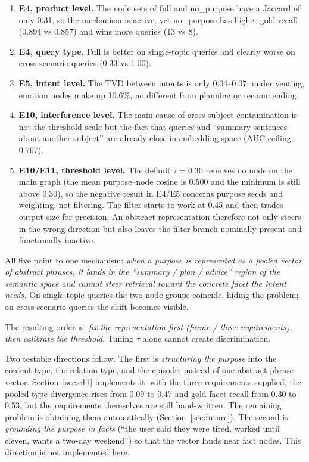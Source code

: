 \documentclass[11pt]{article}
\begin{document}
\begin{enumerate}
  \item \textbf{E4, product level.} The node sets of full and no\_purpose have a Jaccard of only
        0.31, so the mechanism is active; yet no\_purpose has higher gold recall (0.894 vs 0.857)
        and wins more queries (13 vs 8).
  \item \textbf{E4, query type.} Full is better on single-topic queries and clearly worse on
        cross-scenario queries (0.33 vs 1.00).
  \item \textbf{E5, intent level.} The TVD between intents is only 0.04--0.07; under venting,
        emotion nodes make up 10.6\%, no different from planning or recommending.
  \item \textbf{E10, interference level.} The main cause of cross-subject contamination is not
        the threshold scale but the fact that queries and ``summary sentences about another
        subject'' are already close in embedding space (AUC ceiling 0.767).
  \item \textbf{E10/E11, threshold level.} The default $\tau=0.30$ removes no node on the main
        graph (the mean purpose--node cosine is 0.500 and the minimum is still above 0.30), so the
        negative result in E4/E5 concerns purpose seeds and weighting, not filtering. The filter
        starts to work at 0.45 and then trades output size for precision. An abstract
        representation therefore not only steers in the wrong direction but also leaves the filter
        branch nominally present and functionally inactive.
\end{enumerate}

All five point to one mechanism: \emph{when a purpose is represented as a pooled vector of
abstract phrases, it lands in the ``summary / plan / advice'' region of the semantic space and
cannot steer retrieval toward the concrete facet the intent needs.} On single-topic queries the
two node groups coincide, hiding the problem; on cross-scenario queries the shift becomes
visible.

The resulting order is: \emph{fix the representation first (frame / three requirements), then
calibrate the threshold}. Tuning $\tau$ alone cannot create discrimination.

Two testable directions follow. The first is \emph{structuring the purpose} into the content
type, the relation type, and the episode, instead of one abstract phrase vector.
Section~\ref{sec:e11} implements it: with the three requirements supplied, the pooled type
divergence rises from 0.09 to 0.47 and gold-facet recall from 0.30 to 0.53, but the requirements
themselves are still hand-written. The remaining problem is obtaining them automatically
(Section~\ref{sec:future}). The second is \emph{grounding the purpose in facts} (``the user said
they were tired, worked until eleven, wants a two-day weekend'') so that the vector lands near
fact nodes. This direction is not implemented here.
\end{document}
